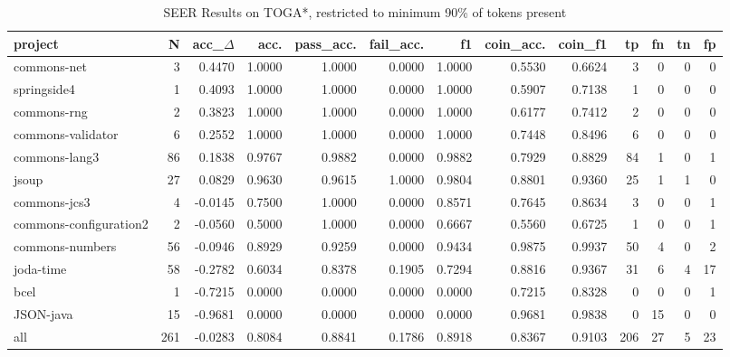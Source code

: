 \begin{table*}
\centering
\caption{SEER Results on TOGA*, restricted to minimum 90\% of tokens present}
\label{tab:toga_results_10}
\begin{tabular}{lrrrrrrrrrrrr}
\toprule
                project &    N &  acc\_$\Delta$ &    acc. &  pass\_acc. &  fail\_acc. &      f1 &  coin\_acc. &  coin\_f1 &   tp &  fn &  tn &  fp \\
\midrule
            commons-net &    3 &      0.4470 &  1.0000 &     1.0000 &     0.0000 &  1.0000 &     0.5530 &   0.6624 &    3 &   0 &   0 &   0 \\
            springside4 &    1 &      0.4093 &  1.0000 &     1.0000 &     0.0000 &  1.0000 &     0.5907 &   0.7138 &    1 &   0 &   0 &   0 \\
            commons-rng &    2 &      0.3823 &  1.0000 &     1.0000 &     0.0000 &  1.0000 &     0.6177 &   0.7412 &    2 &   0 &   0 &   0 \\
      commons-validator &    6 &      0.2552 &  1.0000 &     1.0000 &     0.0000 &  1.0000 &     0.7448 &   0.8496 &    6 &   0 &   0 &   0 \\
          commons-lang3 &   86 &      0.1838 &  0.9767 &     0.9882 &     0.0000 &  0.9882 &     0.7929 &   0.8829 &   84 &   1 &   0 &   1 \\
                  jsoup &   27 &      0.0829 &  0.9630 &     0.9615 &     1.0000 &  0.9804 &     0.8801 &   0.9360 &   25 &   1 &   1 &   0 \\
           commons-jcs3 &    4 &     -0.0145 &  0.7500 &     1.0000 &     0.0000 &  0.8571 &     0.7645 &   0.8634 &    3 &   0 &   0 &   1 \\
 commons-configuration2 &    2 &     -0.0560 &  0.5000 &     1.0000 &     0.0000 &  0.6667 &     0.5560 &   0.6725 &    1 &   0 &   0 &   1 \\
        commons-numbers &   56 &     -0.0946 &  0.8929 &     0.9259 &     0.0000 &  0.9434 &     0.9875 &   0.9937 &   50 &   4 &   0 &   2 \\
              joda-time &   58 &     -0.2782 &  0.6034 &     0.8378 &     0.1905 &  0.7294 &     0.8816 &   0.9367 &   31 &   6 &   4 &  17 \\
                   bcel &    1 &     -0.7215 &  0.0000 &     0.0000 &     0.0000 &  0.0000 &     0.7215 &   0.8328 &    0 &   0 &   0 &   1 \\
              JSON-java &   15 &     -0.9681 &  0.0000 &     0.0000 &     0.0000 &  0.0000 &     0.9681 &   0.9838 &    0 &  15 &   0 &   0 \\
                    all &  261 &     -0.0283 &  0.8084 &     0.8841 &     0.1786 &  0.8918 &     0.8367 &   0.9103 &  206 &  27 &   5 &  23 \\
\bottomrule
\end{tabular}
\end{table*}
